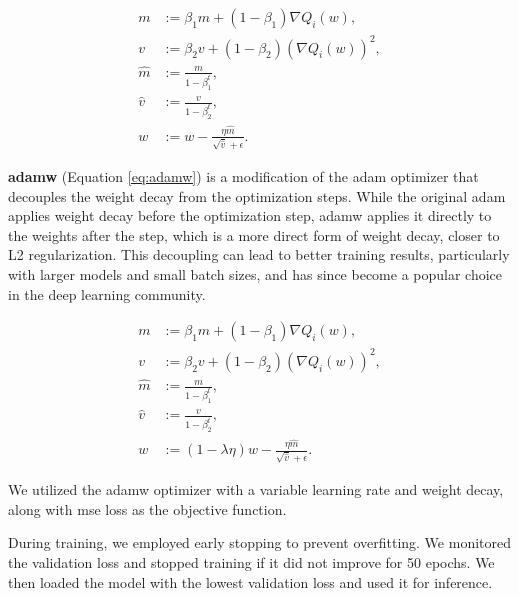 \begin{equation}
	\begin{aligned}
		m       & := \beta_1 m + (1 - \beta_1) \nabla Q_i(w),            \\
		v       & := \beta_2 v + (1 - \beta_2) (\nabla Q_i(w))^2,        \\
		\hat{m} & := \frac{m}{1 - \beta_1^t},                            \\
		\hat{v} & := \frac{v}{1 - \beta_2^t},                            \\
		w       & := w - \frac{\eta \hat{m}}{\sqrt{\hat{v}} + \epsilon}.
	\end{aligned}
	\label{eq:adam}
\end{equation}

\textbf{\gls{adamw}} (Equation \ref{eq:adamw}) is a modification of the \gls{adam} optimizer that decouples
the weight decay from the optimization steps. While the original \gls{adam} applies
weight decay before the optimization step, \gls{adamw} applies it directly to the
weights after the step, which is a more direct form of weight decay, closer to
L2 regularization. This decoupling can lead to better training results,
particularly with larger models and small batch sizes, and has since become
a popular choice in the deep learning community.

\begin{equation}
	\begin{aligned}
		m       & := \beta_1 m + (1 - \beta_1) \nabla Q_i(w),                               \\
		v       & := \beta_2 v + (1 - \beta_2) (\nabla Q_i(w))^2,                           \\
		\hat{m} & := \frac{m}{1 - \beta_1^t},                                               \\
		\hat{v} & := \frac{v}{1 - \beta_2^t},                                               \\
		w       & := (1 - \lambda \eta) w - \frac{\eta \hat{m}}{\sqrt{\hat{v}} + \epsilon}.
	\end{aligned}
	\label{eq:adamw}
\end{equation}

We utilized the \gls{adamw} optimizer with a variable learning rate and weight
decay, along with \gls{mse} loss as the objective function.

During training, we employed early stopping to prevent overfitting. We
monitored the validation loss and stopped training if it did not improve for 50
epochs. We then loaded the model with the lowest validation loss and used it
for inference.


